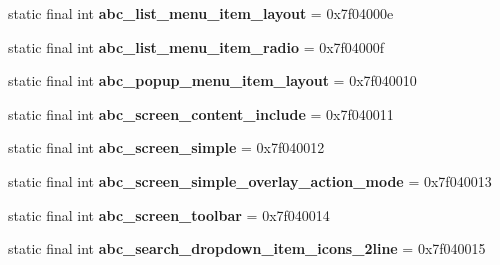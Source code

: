 \begin{DoxyCompactItemize}
\item 
\hypertarget{classandroid_1_1support_1_1design_1_1_r_1_1layout_a7558278a1602fc132cb8a9c6017b5a09}{}static final int {\bfseries abc\+\_\+list\+\_\+menu\+\_\+item\+\_\+layout} = 0x7f04000e\label{classandroid_1_1support_1_1design_1_1_r_1_1layout_a7558278a1602fc132cb8a9c6017b5a09}

\item 
\hypertarget{classandroid_1_1support_1_1design_1_1_r_1_1layout_abeaea14dea4b8b1164cc05e47ab8dde2}{}static final int {\bfseries abc\+\_\+list\+\_\+menu\+\_\+item\+\_\+radio} = 0x7f04000f\label{classandroid_1_1support_1_1design_1_1_r_1_1layout_abeaea14dea4b8b1164cc05e47ab8dde2}

\item 
\hypertarget{classandroid_1_1support_1_1design_1_1_r_1_1layout_a96f5a59e279f130e091777270663f7a3}{}static final int {\bfseries abc\+\_\+popup\+\_\+menu\+\_\+item\+\_\+layout} = 0x7f040010\label{classandroid_1_1support_1_1design_1_1_r_1_1layout_a96f5a59e279f130e091777270663f7a3}

\item 
\hypertarget{classandroid_1_1support_1_1design_1_1_r_1_1layout_ac1ea0700228284eac706a3d1369d7fab}{}static final int {\bfseries abc\+\_\+screen\+\_\+content\+\_\+include} = 0x7f040011\label{classandroid_1_1support_1_1design_1_1_r_1_1layout_ac1ea0700228284eac706a3d1369d7fab}

\item 
\hypertarget{classandroid_1_1support_1_1design_1_1_r_1_1layout_a957aec20303a776f195a00390496753b}{}static final int {\bfseries abc\+\_\+screen\+\_\+simple} = 0x7f040012\label{classandroid_1_1support_1_1design_1_1_r_1_1layout_a957aec20303a776f195a00390496753b}

\item 
\hypertarget{classandroid_1_1support_1_1design_1_1_r_1_1layout_a3098585a2f723080061fd42dd4d91d94}{}static final int {\bfseries abc\+\_\+screen\+\_\+simple\+\_\+overlay\+\_\+action\+\_\+mode} = 0x7f040013\label{classandroid_1_1support_1_1design_1_1_r_1_1layout_a3098585a2f723080061fd42dd4d91d94}

\item 
\hypertarget{classandroid_1_1support_1_1design_1_1_r_1_1layout_a27b17cd1e50e5101addd868ef7348ead}{}static final int {\bfseries abc\+\_\+screen\+\_\+toolbar} = 0x7f040014\label{classandroid_1_1support_1_1design_1_1_r_1_1layout_a27b17cd1e50e5101addd868ef7348ead}

\item 
\hypertarget{classandroid_1_1support_1_1design_1_1_r_1_1layout_ac425206367179409e7f02a364f820c2f}{}static final int {\bfseries abc\+\_\+search\+\_\+dropdown\+\_\+item\+\_\+icons\+\_\+2line} = 0x7f040015\label{classandroid_1_1support_1_1design_1_1_r_1_1layout_ac425206367179409e7f02a364f820c2f}


\end{DoxyCompactItemize}
